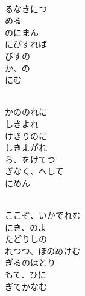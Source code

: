 \documentclass[10pt,b5j]{tarticle} %
\begin{document}
\begin{enumerate}
\begin{minipage}[c]{\blocksize}
        \vspace{\linespace}
        \item~\\
        るなきにつ\\
        める\\
        のにまん\\
        にびすれば\\
        びすの\\
        か、の\\
        にむ
        
    \end{minipage}
    \begin{minipage}[c]{\blocksize}
        
        \vspace{\linespace}
        \item~\\
        かののれに\\
        しきよれ\\
        けきりのに\\
        しきよがれ\\
        ら、をけてつ\\
        ぎなく、へして\\
        にめん
        
    \end{minipage}
    \begin{minipage}[c]{\blocksize}
        
        \vspace{\linespace}
        \item~\\
        ここぞ、いかでれむ\\
        にき、のよ\\
        たどりしの\\
        れつつ、ほのめけむ\\
        ぎるのほとり\\
        もて、ひに\\
        ぎてかなむ
    

\end{minipage}
\end{enumerate}
\end{document}
